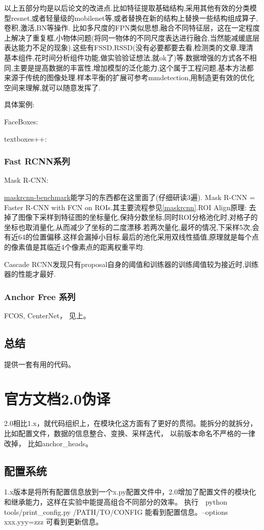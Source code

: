 \documentclass[UTF8]{ctexart}
\begin{document}
以上五部分均是以后论文的改进点.比如特征提取基础结构,采用其他有效的分类模型resnet,或者轻量级的mobilenet等,或者替换在新的结构上替换一些结构组成算子,卷积,激活,BN等操作. 比如多尺度的FPN类似思想,融合不同特征层，这在一定程度上解决了重复框,小物体问题(将同一物体的不同尺度表达进行融合,当然能减缓底层表达能力不足的现象).这些有FSSD,RSSD(没有必要都要去看,检测类的文章,理清基本组件,花时间分析组件功能,做实验验证想法,就ok了)等.数据增强的方式各不相同,主要是提高数据的丰富性,增加模型的泛化能力,这个属于工程问题,基本方法都来源于传统的图像处理.样本平衡的扩展可参考mmdetection,用制造更有效的优化空间来理解,就可以随意发挥了.

具体案例:

FaceBoxes:

textboxes++:


\subsubsection{Fast RCNN系列}
Mask R-CNN:

\href{https://github.com/facebookresearch/maskrcnn-benchmark}{maskrcnn-benchmark}能学习的东西都在这里面了(仔细研读3遍). 
Mask R-CNN = Faster R-CNN  with FCN on ROIs.其主要流程参见\ref{maskrcnn}.ROI Align原理:
去掉了图像下采样到特征图的坐标量化,保持分数坐标,同时ROI分格池化时,对格子的坐标也取消量化,从而减少了坐标的二度漂移.若两次量化,最坏的情况,下采样5次,会有近64的位置偏移,这样会漏掉小目标.最后的池化采用双线性插值,原理就是每个点的像素值是其临近4个像素点的距离权重平均.

Cascade RCNN发现只有proposal自身的阈值和训练器的训练阈值较为接近时,训练器的性能才最好.
\subsubsection{Anchor Free 系列}
FCOS, CenterNet， 见上。

\subsection{总结}

提供一套有用的代码。

\section{官方文档2.0伪译}
2.0相比1.x，就代码组织上，在模块化这方面有了更好的贯彻。能拆分的就拆分，比如配置文件，数据的信息整合、变换、采样迭代，
以前版本命名不严格的一律改掉， 比如anchor\_heads。
\subsection{配置系统}
1.x版本是将所有配置信息放到一个x.py配置文件中，2.0增加了配置文件的模块化和继承能力，这样在实验中能提高组合不同部分的效率。
执行　python tools/print\_config.py /PATH/TO/CONFIG 能看到配置信息。--options xxx.yyy=zzz  可看到更新信息。
\end{document}

